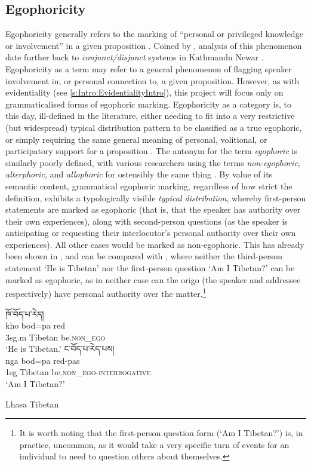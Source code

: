 \subsection{Egophoricity}\label{s:Intro:EgophoricityIntro}
Egophoricity generally refers to the marking of ``personal or privileged knowledge or involvement'' in a given proposition \cite[2]{EgoIntro}. Coined by , analysis of this phenomenon date further back to \textit{conjunct/disjunct} systems in Kathmandu Newar \cite[Newaric: Nepal, ][]{HaleNewar1980}. Egophoricity as a term may refer to a general phenomenon of flagging speaker involvement in, or personal connection to, a given proposition. However, as with evidentiality (see \ref{s:Intro:EvidentialityIntro}), this project will focus only on grammaticalised forms of egophoric marking. Egophoricity as a category is, to this day, ill-defined in the literature, either needing to fit into a very restrictive (but widespread) typical distribution pattern to be classified as a true egophoric, or simply requiring the same general meaning of personal, volitional, or participatory support for a proposition \cites{EgoIntro}{Gawne2017}. The antonym for the term \textit{egophoric} is similarly poorly defined, with various researchers using the terms \textit{non-egophoric, alterphoric,} and \textit{allophoric} for ostensibly the same thing \cite{Widmer2020}. By value of its semantic content, grammatical egophoric marking, regardless of how strict the definition, exhibits a typologically visible \textit{typical distribution}, whereby first-person statements are marked as egophoric (that is, that the speaker has authority over their own experiences), along with second-person questions (as the speaker is anticipating or requesting their interlocutor's personal authority over their own experiences). All other cases would be marked as non-egophoric. This has already been shown in , and can be compared with , where neither the third-person statement `He is Tibetan' nor the first-person question `Am I Tibetan?' can be marked as egophoric, as in neither case can the origo (the speaker and addressee respectively) have personal authority over the matter.\footnote{It is worth noting that the first-person question form (`Am I Tibetan?') is, in practice, uncommon, as it would take a very specific turn of events for an individual to need to question others about themselves.}

\begin{exe}
\ex\label{ex:EgoDistribution}
\begin{xlist}
\ex 
\glll \texttibetan{ཁོ་བོད་པ་རེད།} \\
kho bod=pa red \\
3sg.m Tibetan be.\textsc{non\_ego} \\
\glt `He is Tibetan.'
\ex 
\glll \texttibetan{ང་བོད་པ་རེད་པས།} \\
nga bod=pa red-pas \\
1sg Tibetan be.\textsc{non\_ego}-\textsc{interrogative} \\
\glt `Am I Tibetan?'
\end{xlist}
Lhasa Tibetan \cite[Tibetic: PRC,][394]{DeLancey2017Tibetan}
\end{exe}

